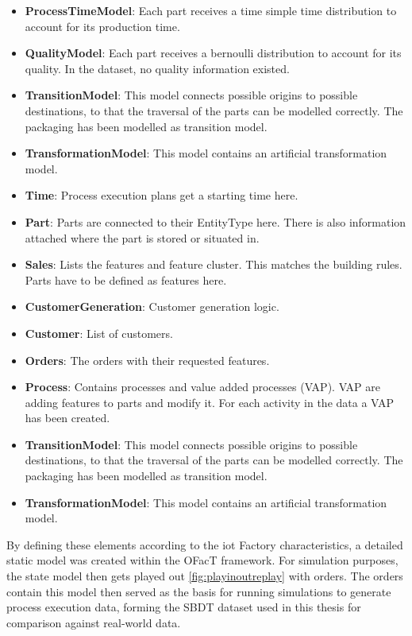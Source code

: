 \begin{itemize}
    \item \textbf{ProcessTimeModel}: Each part receives a time simple time distribution to account for its production time.
    \item \textbf{QualityModel}: Each part receives a bernoulli distribution to account for its quality. In the dataset, no quality information existed.
    \item \textbf{TransitionModel}: This model connects possible origins to possible destinations, to that the traversal of the parts can be modelled correctly. The packaging has been modelled as transition model.
    \item \textbf{TransformationModel}: This model contains an artificial transformation model.
    \item \textbf{Time}: Process execution plans get a starting time here.
    \item \textbf{Part}: Parts are connected to their EntityType here. There is also information attached where the part is stored or situated in.
    \item \textbf{Sales}: Lists the features and feature cluster. This matches the building rules. Parts have to be defined as features here.
    \item \textbf{CustomerGeneration}: Customer generation logic.
    \item \textbf{Customer}: List of customers.
    \item \textbf{Orders}: The orders with their requested features.
    \item \textbf{Process}: Contains processes and value added processes (VAP). VAP are adding features to parts and modify it. For each activity in the data a VAP has been created.
    \item \textbf{TransitionModel}: This model connects possible origins to possible destinations, to that the traversal of the parts can be modelled correctly. The packaging has been modelled as transition model.
    \item \textbf{TransformationModel}: This model contains an artificial transformation model.
\end{itemize}

By defining these elements according to the \gls{iot} Factory characteristics, a detailed static model was created within the OFacT framework. For simulation purposes, the state model then gets played out \autoref{fig:playinoutreplay} with orders. The orders contain this model then served as the basis for running simulations to generate process execution data, forming the SBDT dataset used in this thesis for comparison against real-world data.

